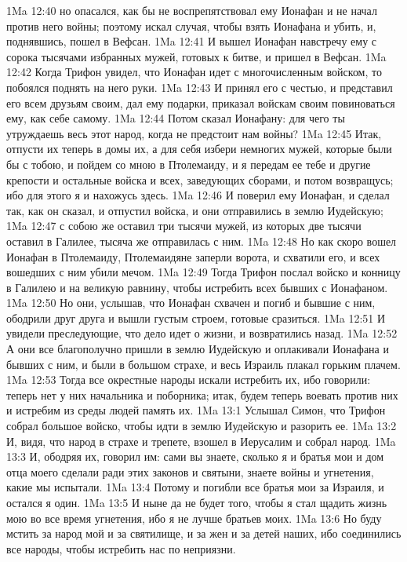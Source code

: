 \vs 1Ma 12:40 но опасался, как бы не воспрепятствовал ему Ионафан и не начал против него войны; поэтому искал случая, чтобы взять Ионафана и убить, и, поднявшись, пошел в Вефсан.
\vs 1Ma 12:41 И вышел Ионафан навстречу ему с сорока тысячами избранных мужей, готовых к битве, и пришел в Вефсан.
\vs 1Ma 12:42 Когда Трифон увидел, что Ионафан идет с многочисленным войском, то побоялся поднять на него руки.
\vs 1Ma 12:43 И принял его с честью, и представил его всем друзьям своим, дал ему подарки, приказал войскам своим повиноваться ему, как себе самому.
\vs 1Ma 12:44 Потом сказал Ионафану: для чего ты утруждаешь весь этот народ, когда не предстоит нам войны?
\vs 1Ma 12:45 Итак, отпусти их теперь в домы их, а для себя избери немногих мужей, которые были бы с тобою, и пойдем со мною в Птолемаиду, и я передам ее тебе и другие крепости и остальные войска и всех, заведующих сборами, и потом возвращусь; ибо для этого я и нахожусь здесь.
\vs 1Ma 12:46 И поверил ему Ионафан, и сделал так, как он сказал, и отпустил войска, и они отправились в землю Иудейскую;
\vs 1Ma 12:47 с собою же оставил три тысячи мужей, из которых две тысячи оставил в Галилее, тысяча же отправилась с ним.
\vs 1Ma 12:48 Но как скоро вошел Ионафан в Птолемаиду, Птолемаидяне заперли ворота, и схватили его, и всех вошедших с ним убили мечом.
\vs 1Ma 12:49 Тогда Трифон послал войско и конницу в Галилею и на великую равнину, чтобы истребить всех бывших с Ионафаном.
\vs 1Ma 12:50 Но они, услышав, что Ионафан схвачен и погиб и бывшие с ним, ободрили друг друга и вышли густым строем, готовые сразиться.
\vs 1Ma 12:51 И увидели преследующие, что дело идет о жизни, и возвратились назад.
\vs 1Ma 12:52 А они все благополучно пришли в землю Иудейскую и оплакивали Ионафана и бывших с ним, и были в большом страхе, и весь Израиль плакал горьким плачем.
\vs 1Ma 12:53 Тогда все окрестные народы искали истребить их, ибо говорили: теперь нет у них начальника и поборника; итак, будем теперь воевать против них и истребим из среды людей память их.
\vs 1Ma 13:1 Услышал Симон, что Трифон собрал большое войско, чтобы идти в землю Иудейскую и разорить ее.
\vs 1Ma 13:2 И, видя, что народ в страхе и трепете, взошел в Иерусалим и собрал народ.
\vs 1Ma 13:3 И, ободряя их, говорил им: сами вы знаете, сколько я и братья мои и дом отца моего сделали ради этих законов и святыни, знаете войны и угнетения, какие мы испытали.
\vs 1Ma 13:4 Потому и погибли все братья мои за Израиля, и остался я один.
\vs 1Ma 13:5 И ныне да не будет того, чтобы я стал щадить жизнь мою во все время угнетения, ибо я не лучше братьев моих.
\vs 1Ma 13:6 Но буду мстить за народ мой и за святилище, и за жен и за детей наших, ибо соединились все народы, чтобы истребить нас по неприязни.
